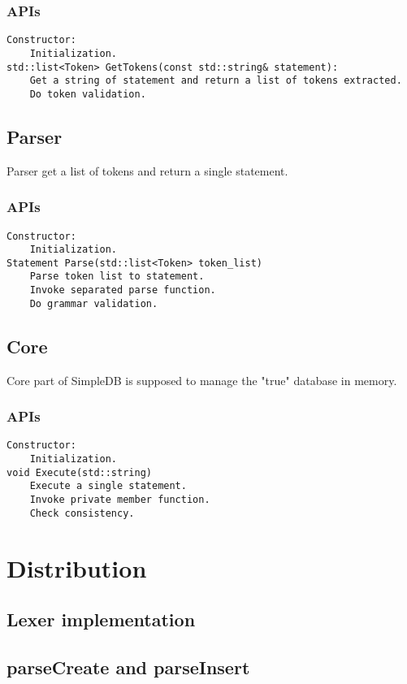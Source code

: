 \documentclass[12pt,a4paper,oneside,draft]{report}
\begin{document}
\subsubsection{APIs}
\begin{verbatim}
Constructor:
    Initialization.
std::list<Token> GetTokens(const std::string& statement):
    Get a string of statement and return a list of tokens extracted.
    Do token validation.
\end{verbatim}

\subsection{Parser}
Parser get a list of tokens and return a single statement.
\subsubsection{APIs}
\begin{verbatim}
Constructor:
    Initialization.
Statement Parse(std::list<Token> token_list)
    Parse token list to statement.
    Invoke separated parse function.
    Do grammar validation.
\end{verbatim}

\subsection{Core}
Core part of SimpleDB is supposed to manage the "true" database in memory.\\
\subsubsection{APIs}
\begin{verbatim}
Constructor:
    Initialization.
void Execute(std::string)
    Execute a single statement.
    Invoke private member function.
    Check consistency. 
\end{verbatim}

\section{Distribution}
\subsection{Lexer implementation}
\subsection{parseCreate and parseInsert}
\end{document}
